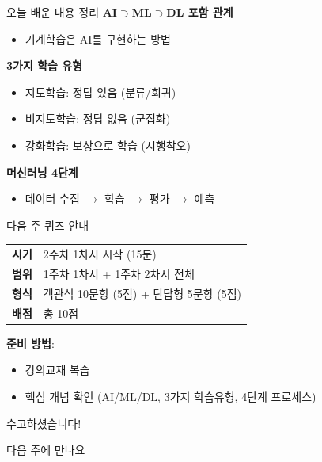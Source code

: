 \documentclass[aspectratio=169,11pt]{beamer}
\begin{document}
\begin{frame}{오늘 배운 내용 정리}
 \textbf{AI$\supset$ML$\supset$DL 포함 관계}
\begin{itemize}
\item 기계학습은 AI를 구현하는 방법
\end{itemize}

\vspace{0.3cm}
 \textbf{3가지 학습 유형}
\begin{itemize}
\item 지도학습: 정답 있음 (분류/회귀)
\item 비지도학습: 정답 없음 (군집화)
\item 강화학습: 보상으로 학습 (시행착오)
\end{itemize}

\vspace{0.3cm}
 \textbf{머신러닝 4단계}
\begin{itemize}
\item 데이터 수집 $\rightarrow$ 학습 $\rightarrow$ 평가 $\rightarrow$ 예측
\end{itemize}
\end{frame}

\begin{frame}{다음 주 퀴즈 안내 }
\begin{center}
\begin{tabular}{ll}
\textbf{시기} & 2주차 1차시 시작 (15분) \\
\textbf{범위} & 1주차 1차시 + 1주차 2차시 전체 \\
\textbf{형식} & 객관식 10문항 (5점) + 단답형 5문항 (5점) \\
\textbf{배점} & 총 10점 \\
\end{tabular}
\end{center}

\vspace{0.5cm}
\textbf{준비 방법}:
\begin{itemize}
\item 강의교재 복습
\item 핵심 개념 확인 (AI/ML/DL, 3가지 학습유형, 4단계 프로세스)
\end{itemize}
\end{frame}

\begin{frame}[standout]
 수고하셨습니다!

\vspace{0.5cm}
다음 주에 만나요 
\end{frame}
\end{document}
